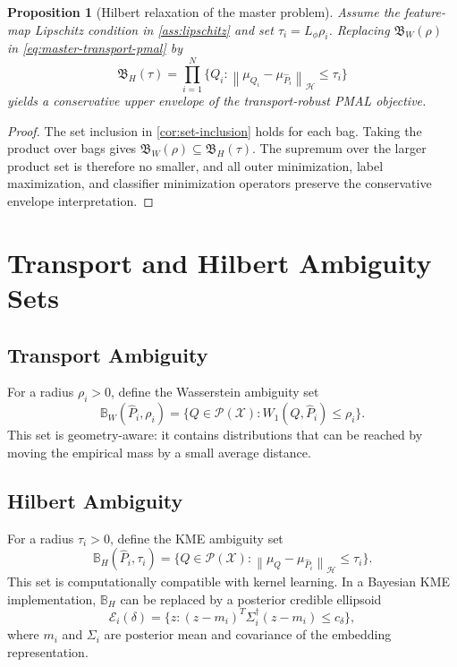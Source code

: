 \documentclass[10pt,journal]{IEEEtran}
\newtheorem{proposition}{Proposition}
\newcommand{\Pcal}{\mathcal{P}}
\newcommand{\Xcal}{\mathcal{X}}
\newcommand{\Hcal}{\mathcal{H}}
\newcommand{\wh}{\widehat}
\newcommand{\norm}[1]{\left\lVert #1 \right\rVert}
\newcommand{\ball}{\mathbb{B}}
\begin{document}
\begin{proposition}[Hilbert relaxation of the master problem]
\label{prop:master-relaxation}
Assume the feature-map Lipschitz condition in \cref{ass:lipschitz} and set $\tau_i=L_\phi\rho_i$. Replacing $\mathfrak{B}_W(\rho)$ in \eqref{eq:master-transport-pmal} by
\begin{equation}
\label{eq:hilbert-product-ball}
\mathfrak{B}_H(\tau)=
\prod_{i=1}^{N}\{Q_i:\norm{\mu_{Q_i}-\mu_{\wh P_i}}_{\Hcal}\le \tau_i\}
\end{equation}
yields a conservative upper envelope of the transport-robust PMAL objective.
\end{proposition}

\begin{proof}
The set inclusion in \cref{cor:set-inclusion} holds for each bag. Taking the product over bags gives $\mathfrak{B}_W(\rho)\subseteq \mathfrak{B}_H(\tau)$. The supremum over the larger product set is therefore no smaller, and all outer minimization, label maximization, and classifier minimization operators preserve the conservative envelope interpretation.
\end{proof}



\section{Transport and Hilbert Ambiguity Sets}
\label{sec:sets}

\subsection{Transport Ambiguity}

For a radius $\rho_i>0$, define the Wasserstein ambiguity set
\begin{equation}
\label{eq:wball}
    \ball_W(\wh P_i,\rho_i)=\{Q\in\Pcal(\Xcal):W_1(Q,\wh P_i)\le \rho_i\}.
\end{equation}
This set is geometry-aware: it contains distributions that can be reached by moving the empirical mass by a small average distance.

\subsection{Hilbert Ambiguity}

For a radius $\tau_i>0$, define the KME ambiguity set
\begin{equation}
\label{eq:hball}
    \ball_H(\wh P_i,\tau_i)=\{Q\in\Pcal(\Xcal):\norm{\mu_Q-\mu_{\wh P_i}}_{\Hcal}\le \tau_i\}.
\end{equation}
This set is computationally compatible with kernel learning. In a Bayesian KME implementation, $\ball_H$ can be replaced by a posterior credible ellipsoid
\begin{equation}
\label{eq:ellipsoid}
    \mathcal{E}_i(\delta)=\{z:(z-m_i)^T\Sigma_i^\dagger(z-m_i)\le c_{\delta}\},
\end{equation}
where $m_i$ and $\Sigma_i$ are posterior mean and covariance of the embedding representation.
\end{document}
